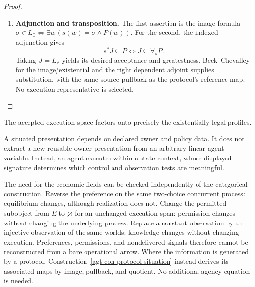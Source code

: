 \documentclass[11pt,a4paper]{article}
\numberwithin{equation}{section}
\theoremstyle{definition}
\theoremstyle{remark}
\theoremstyle{plain}
\begin{document}
\begin{proof}
\leavevmode
\begin{enumerate}[label=\textup{(\arabic*)},leftmargin=*,itemsep=4pt,topsep=3pt]
  \item \textbf{Adjunction and transposition.} The first assertion is the image formula
$\sigma\in L_{\exists}\iff\exists w\,(s(w)=\sigma\wedge P(w))$. For the second, the indexed adjunction gives
\[
 s^*J\subseteq P\iff J\subseteq\forall_sP.
\]
Taking $J=L_{\forall}$ yields its desired acceptance and greatestness. Beck--Chevalley for the image/existential and the right dependent
adjoint supplies substitution, with the same source pullback as the
protocol's reference map. No execution representative is selected.
\end{enumerate}
\end{proof}

\noindent The accepted execution space factors onto precisely the existentially legal profiles.
\begin{center}
\end{center}

A situated presentation depends on declared owner and policy data.
It does not extract a new reusable owner presentation from an arbitrary
linear agent variable. Instead, an agent executes within a state context,
whose displayed signature determines which control and observation
tests are meaningful.

The need for the economic fields can be checked independently of
the categorical construction. Reverse the preference on the same
two-choice concurrent process: equilibrium changes, although realization
does not. Change the permitted subobject from $E$ to $\varnothing$ for an
unchanged execution span:
permission changes without changing the underlying process. Replace a
constant observation by an injective observation of the same worlds:
knowledge changes without changing execution. Preferences, permissions,
and nondelivered signals therefore cannot be reconstructed from a bare
operational arrow. Where the information is generated by a protocol,
Construction~\ref{agt-con-protocol-situation} instead derives its
associated maps by image, pullback, and quotient. No additional agency
equation is needed.
\end{document}
